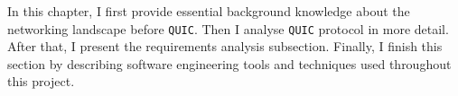 \documentclass[12pt,a4paper,twoside,openright]{report}
\begin{document}












In this chapter, I first provide essential background knowledge about the networking landscape before \texttt{QUIC}. 
Then I analyse \texttt{QUIC} protocol in more detail.
After that, I present the requirements analysis subsection.
Finally, I finish this section by describing software engineering tools and techniques used throughout this project.
\end{document}
